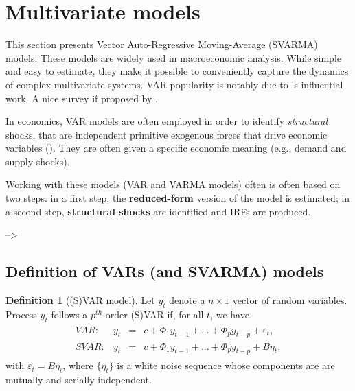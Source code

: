 \documentclass[
  12pt,
]{book}
\theoremstyle{definition}
\newtheorem{definition}{Definition}[chapter]
\theoremstyle{definition}
\theoremstyle{definition}
\theoremstyle{definition}
\theoremstyle{remark}
\begin{document}
\hypertarget{VAR}{%
\section{Multivariate models}\label{VAR}}

This section presents Vector Auto-Regressive Moving-Average (SVARMA) models. These models are widely used in macroeconomic analysis. While simple and easy to estimate, they make it possible to conveniently capture the dynamics of complex multivariate systems. VAR popularity is notably due to \citet{Sims_1980}'s influential work. A nice survey if proposed by \citet{Stock_Watson_2016}.

In economics, VAR models are often employed in order to identify \emph{structural} shocks, that are independent primitive exogenous forces that drive economic variables (\citet{Ramey_2016_NBER}). They are often given a specific economic meaning (e.g., demand and supply shocks).

Working with these models (VAR and VARMA models) often is often based on two steps: in a first step, the \textbf{reduced-form} version of the model is estimated; in a second step, \textbf{structural shocks} are identified and IRFs are produced.

--\textgreater{}

\hypertarget{definition-of-vars-and-svarma-models}{%
\subsection{Definition of VARs (and SVARMA) models}\label{definition-of-vars-and-svarma-models}}

\begin{definition}[(S)VAR model]
\protect\hypertarget{def:SVAR}{}\label{def:SVAR}Let \(y_{t}\) denote a \(n \times1\) vector of random variables. Process \(y_{t}\) follows a \(p^{th}\)-order (S)VAR if, for all \(t\), we have
\begin{eqnarray}
\begin{array}{rllll}
VAR:& y_t &=& c + \Phi_1 y_{t-1} + \dots + \Phi_p y_{t-p} + \varepsilon_t,\\
SVAR:& y_t &=& c + \Phi_1 y_{t-1} + \dots + \Phi_p y_{t-p} + B \eta_t,
\end{array}\label{eq:yVAR}
\end{eqnarray}
with \(\varepsilon_t = B\eta_t\), where \(\{\eta_{t}\}\) is a white noise sequence whose components are are mutually and serially independent.
\end{definition}
\end{document}
